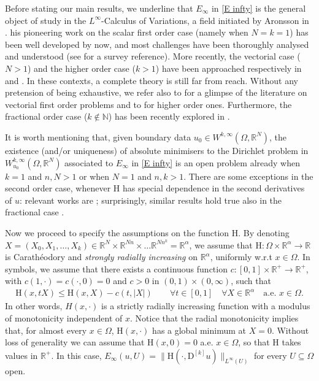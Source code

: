 \documentclass[a4paper,11pt]{article}
\numberwithin{equation}{section}
\newcommand{\numberset}{\mathbb}
\newcommand{\N}{\numberset{N}}
\newcommand{\Om}{\Omega}
\newcommand{\R}{\numberset{R}}
\newcommand{\rom}{\mathrm}
\theoremstyle{definition}
\begin{document}
Before stating our main results, we underline that $E_\infty$ in \eqref{E infty} is the general object of study in the $L^\infty$-Calculus of Variations, a field initiated by Aronsson in \cite{A}. his pioneering work on the scalar first order case (namely when $N=k=1$) has been well developed by now, and most challenges have been thoroughly analysed and understood (see \cite{Kbook} for a survey reference). More recently,  the vectorial case ($N>1$) and the higher order case ($k>1$) have been approached respectively in \cite{K1} and \cite{KM,KP2}. In these contexts, a complete theory is still far from reach. Without any pretension of being exhaustive, we refer also to \cite{K3,K4,KM1} for a glimpse of the literature on vectorial first order problems and to \cite{CKM,DK,KP1,KM2,KM3} for higher order ones. Furthermore, the fractional order case ($k\notin\N$) has been recently explored in \cite{CM}.  

It is worth mentioning that, given boundary data $u_0\in W^{k,\infty}(\Om,\R^N)$, the existence (and/or uniqueness) of absolute minimisers to the Dirichlet problem in $W_{u_0}^{k,\infty}(\Om,\R^N)$ associated to $E_\infty$ in \eqref{E infty} 
 is an open problem already when $k=1$ and $n,N>1$ or when $N=1$ and $n,k>1$. There are some exceptions in the second order case, whenever $\rom H$ has special dependence in the second derivatives of $u$: relevant works are \cite{KM, KM3, KP2, CKM}; surprisingly, similar results hold true also in the fractional case \cite{CM}.

Now we proceed to specify the assumptions on the function $\rom{H}$. By denoting $X=(X_0,X_1,\ldots,X_k)\in \R^N\times \R^{Nn}\times\ldots\R^{Nn^k}=\R^\alpha$, we assume that $\rom{H}:\Om\times\R^\alpha\to\R$ is Carathéodory and \textit{strongly radially increasing} on $\R^\alpha$, uniformly w.r.t $x\in \Omega$. In symbols, we assume that there exists a continuous function $c:[0,1]\times\R^+\to\R^+$, with $c(1,\cdot)=c(\cdot,0)=0$ and $c>0$ in $(0,1)\times(0,\infty)$, such that
\begin{align}\label{strong mon}
\rom{H}(x,tX)\leq \rom{H}(x,X)-c(t,|X|)\qquad\forall t\in[0,1]\quad\forall X\in\R^\alpha\quad\mbox{a.e. }x\in \Om.
\end{align}
In other words, $H(x,\cdot)$ is a strictly radially increasing function with a modulus of monotonicity independent of $x$.
Notice that the radial monotonicity implies that, for almost every $x\in\Om$, $\rom{H}(x,\cdot)$ has a global minimum at $X=0$. Without loss of generality we can assume that $\rom{H}(x,0)=0$ a.e. $x\in\Om$, so that $\rom{H}$ takes values in $\R^+$. In this case, $E_\infty(u,U)=\|\rom{H}(\cdot, \mathrm D^{[k]}u)\|_{L^\infty(U)}$ for every $U\subseteq\Om$ open.
\end{document}

